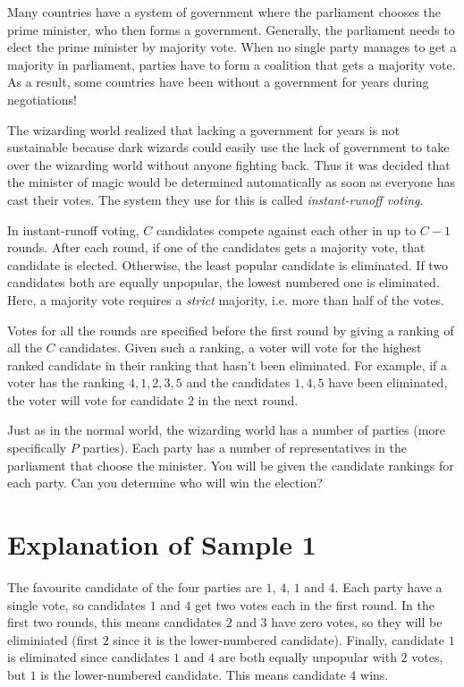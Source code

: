 
\noindent
Many countries have a system of government where the parliament chooses the prime minister, who then forms a government.
Generally, the parliament needs to elect the prime minister by majority vote.
When no single party manages to get a majority in parliament, parties have to form a coalition that gets a majority vote.
As a result, some countries have been without a government for years during negotiations!

The wizarding world realized that lacking a government for years is not sustainable because dark wizards could easily use the lack of government to take over the wizarding world without anyone fighting back.
Thus it was decided that the minister of magic would be determined automatically as soon as everyone has cast their votes.
The system they use for this is called \emph{instant-runoff voting}.

In instant-runoff voting, $C$ candidates compete against each other in up to $C - 1$ rounds.
After each round, if one of the candidates gets a majority vote, that candidate is elected.
Otherwise, the least popular candidate is eliminated.
If two candidates both are equally unpopular, the lowest numbered one is eliminated.
Here, a majority vote requires a \emph{strict} majority, i.e. more than half of the votes.

Votes for all the rounds are specified before the first round by giving a ranking of all the $C$ candidates.
Given such a ranking, a voter will vote for the highest ranked candidate in their ranking that hasn't been eliminated.
For example, if a voter has the ranking $4, 1, 2, 3, 5$ and the candidates $1, 4, 5$ have been eliminated, the voter will vote for candidate $2$ in the next round.

Just as in the normal world, the wizarding world has a number of parties (more specifically $P$ parties).
Each party has a number of representatives in the parliament that choose the minister.
You will be given the candidate rankings for each party.
Can you determine who will win the election?

\section*{Explanation of Sample 1}
The favourite candidate of the four parties are $1$, $4$, $1$ and $4$.
Each party have a single vote, so candidates $1$ and $4$ get two votes each in the first round.
In the first two rounds, this means candidates $2$ and $3$ have zero votes, so they will be eliminiated (first $2$ since it is the lower-numbered candidate).
Finally, candidate $1$ is eliminated since candidates $1$ and $4$ are both equally unpopular with $2$ votes, but $1$ is the lower-numbered candidate.
This means candidate $4$ wins.


